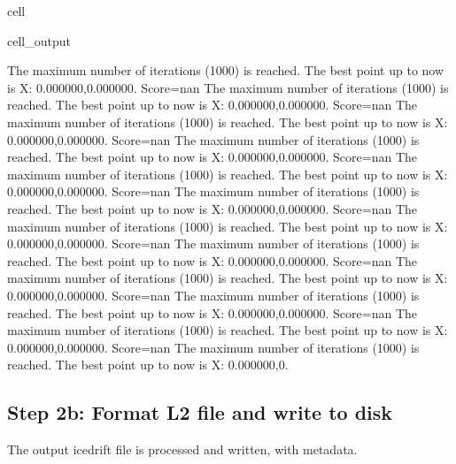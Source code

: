 \documentclass[letterpaper,10pt,english]{jupyterBook}
\begin{document}
\begin{sphinxuseclass}{cell}
\begin{sphinxVerbatimOutput}
\begin{sphinxuseclass}{cell_output}
\begin{sphinxVerbatim}[commandchars=\\\{\}]
The maximum number of iterations (1000) is reached. The best point up to now is X: \PYGZob{}0.000000,0.000000\PYGZcb{}. Score=\PYGZhy{}nan
The maximum number of iterations (1000) is reached. The best point up to now is X: \PYGZob{}0.000000,0.000000\PYGZcb{}. Score=\PYGZhy{}nan
The maximum number of iterations (1000) is reached. The best point up to now is X: \PYGZob{}0.000000,0.000000\PYGZcb{}. Score=\PYGZhy{}nan
The maximum number of iterations (1000) is reached. The best point up to now is X: \PYGZob{}0.000000,0.000000\PYGZcb{}. Score=\PYGZhy{}nan
The maximum number of iterations (1000) is reached. The best point up to now is X: \PYGZob{}0.000000,0.000000\PYGZcb{}. Score=\PYGZhy{}nan
The maximum number of iterations (1000) is reached. The best point up to now is X: \PYGZob{}0.000000,0.000000\PYGZcb{}. Score=\PYGZhy{}nan
The maximum number of iterations (1000) is reached. The best point up to now is X: \PYGZob{}0.000000,0.000000\PYGZcb{}. Score=\PYGZhy{}nan
The maximum number of iterations (1000) is reached. The best point up to now is X: \PYGZob{}0.000000,0.000000\PYGZcb{}. Score=\PYGZhy{}nan
The maximum number of iterations (1000) is reached. The best point up to now is X: \PYGZob{}0.000000,0.000000\PYGZcb{}. Score=\PYGZhy{}nan
The maximum number of iterations (1000) is reached. The best point up to now is X: \PYGZob{}0.000000,0.000000\PYGZcb{}. Score=\PYGZhy{}nan
The maximum number of iterations (1000) is reached. The best point up to now is X: \PYGZob{}0.000000,0.000000\PYGZcb{}. Score=\PYGZhy{}nan
The maximum number of iterations (1000) is reached. The best point up to now is X: \PYGZob{}0.000000,0.
\end{sphinxVerbatim}

\end{sphinxuseclass}\end{sphinxVerbatimOutput}

\end{sphinxuseclass}

\subsection{Step 2b: Format L2 file and write to disk}
\label{\detokenize{CIMR_L2_Sea_Ice_Drift_algorithm:step-2b-format-l2-file-and-write-to-disk}}
\sphinxAtStartPar
The output icedrift file is processed and written, with metadata.
\end{document}
